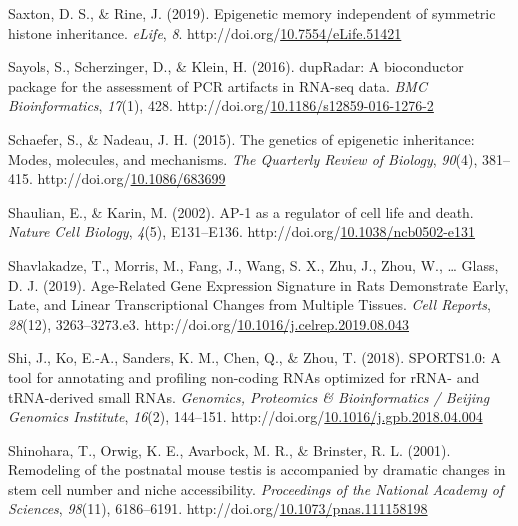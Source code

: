 \documentclass[12pt,twoside]{reedthesis}
\newlength{\cslhangindent}
\newenvironment{CSLReferences}[2] %
 {%
  \setlength{\parindent}{0pt}
  \ifodd #1 \everypar{\setlength{\hangindent}{\cslhangindent}}\ignorespaces\fi
  \ifnum #2 > 0
  \setlength{\parskip}{#2\baselineskip}
  \fi
 }%
 {}
\begin{document}
\begin{CSLReferences}{1}{0}
\leavevmode{}%
Saxton, D. S., \& Rine, J. (2019). Epigenetic memory independent of symmetric histone inheritance. \emph{eLife}, \emph{8}. http://doi.org/\href{https://doi.org/10.7554/eLife.51421}{10.7554/eLife.51421}

\leavevmode{}%
Sayols, S., Scherzinger, D., \& Klein, H. (2016). dupRadar: A bioconductor package for the assessment of PCR artifacts in RNA-seq data. \emph{BMC Bioinformatics}, \emph{17}(1), 428. http://doi.org/\href{https://doi.org/10.1186/s12859-016-1276-2}{10.1186/s12859-016-1276-2}

\leavevmode{}%
Schaefer, S., \& Nadeau, J. H. (2015). The genetics of epigenetic inheritance: Modes, molecules, and mechanisms. \emph{The Quarterly Review of Biology}, \emph{90}(4), 381--415. http://doi.org/\href{https://doi.org/10.1086/683699}{10.1086/683699}

\leavevmode{}%
Shaulian, E., \& Karin, M. (2002). AP-1 as a regulator of cell life and death. \emph{Nature Cell Biology}, \emph{4}(5), E131--E136. http://doi.org/\href{https://doi.org/10.1038/ncb0502-e131}{10.1038/ncb0502-e131}

\leavevmode{}%
Shavlakadze, T., Morris, M., Fang, J., Wang, S. X., Zhu, J., Zhou, W., \ldots{} Glass, D. J. (2019). Age-Related Gene Expression Signature in Rats Demonstrate Early, Late, and Linear Transcriptional Changes from Multiple Tissues. \emph{Cell Reports}, \emph{28}(12), 3263--3273.e3. http://doi.org/\href{https://doi.org/10.1016/j.celrep.2019.08.043}{10.1016/j.celrep.2019.08.043}

\leavevmode{}%
Shi, J., Ko, E.-A., Sanders, K. M., Chen, Q., \& Zhou, T. (2018). SPORTS1.0: A tool for annotating and profiling non-coding RNAs optimized for rRNA- and tRNA-derived small RNAs. \emph{Genomics, Proteomics \& Bioinformatics / Beijing Genomics Institute}, \emph{16}(2), 144--151. http://doi.org/\href{https://doi.org/10.1016/j.gpb.2018.04.004}{10.1016/j.gpb.2018.04.004}

\leavevmode{}%
Shinohara, T., Orwig, K. E., Avarbock, M. R., \& Brinster, R. L. (2001). Remodeling of the postnatal mouse testis is accompanied by dramatic changes in stem cell number and niche accessibility. \emph{Proceedings of the National Academy of Sciences}, \emph{98}(11), 6186--6191. http://doi.org/\href{https://doi.org/10.1073/pnas.111158198}{10.1073/pnas.111158198}


\end{CSLReferences}
\end{document}
